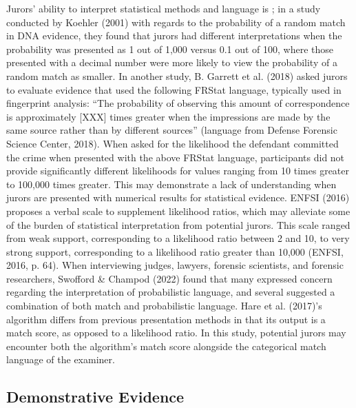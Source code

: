 \documentclass[print]{nuthesis}
\begin{document}
Jurors' ability to interpret statistical methods and language is ; in a study conducted by Koehler (2001) with regards to the probability of a random match in DNA evidence, they found that jurors had different interpretations when the probability was presented as 1 out of 1,000 versus 0.1 out of 100, where those presented with a decimal number were more likely to view the probability of a random match as smaller.
In another study, B. Garrett et al. (2018) asked jurors to evaluate evidence that used the following FRStat language, typically used in fingerprint analysis: ``The probability of observing this amount of correspondence is approximately {[}XXX{]} times greater when the impressions are made by the same source rather than by different sources'' (language from Defense Forensic Science Center, 2018).
When asked for the likelihood the defendant committed the crime when presented with the above FRStat language, participants did not provide significantly different likelihoods for values ranging from 10 times greater to 100,000 times greater.
This may demonstrate a lack of understanding when jurors are presented with numerical results for statistical evidence.
ENFSI (2016) proposes a verbal scale to supplement likelihood ratios, which may alleviate some of the burden of statistical interpretation from potential jurors.
This scale ranged from weak support, corresponding to a likelihood ratio between 2 and 10, to very strong support, corresponding to a likelihood ratio greater than 10,000 (ENFSI, 2016, p. 64).
When interviewing judges, lawyers, forensic scientists, and forensic researchers, Swofford \& Champod (2022) found that many expressed concern regarding the interpretation of probabilistic language, and several suggested a combination of both match and probabilistic language.
Hare et al. (2017)'s algorithm differs from previous presentation methods in that its output is a match score, as opposed to a likelihood ratio.
In this study, potential jurors may encounter both the algorithm's match score alongside the categorical match language of the examiner.

\hypertarget{demonstrative-evidence-1}{%
\subsection{Demonstrative Evidence}\label{demonstrative-evidence-1}}
\end{document}
